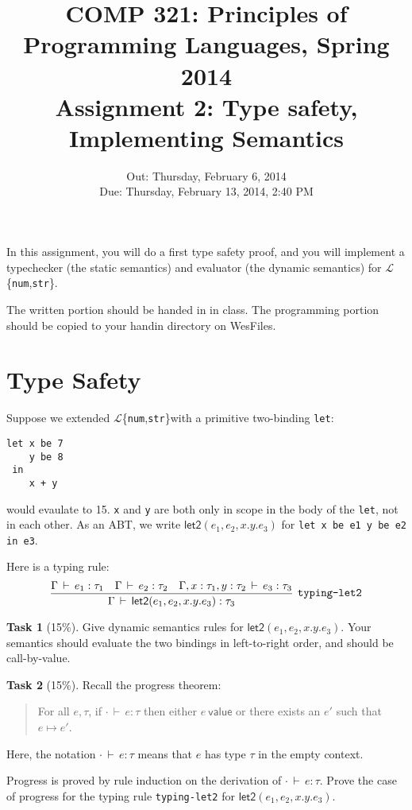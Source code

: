 \documentclass[11pt]{article}
\title{COMP 321: Principles of Programming Languages, Spring 2014 \\
       Assignment 2: Type safety, Implementing Semantics}
\date{Out: Thursday, February 6, 2014 \\
Due: Thursday, February 13, 2014, 2:40 PM}
\newcommand{\task}[2]
  {\bigskip \noindent
   {\bf Task #1} (#2\%).}
\newcommand{\EXP}[0]{$\mathcal{L}$\{\texttt{num},\texttt{str}\}}
\newcommand{\typeof}[3]{\ensuremath{#1 \, \vdash \, #2 : #3}}
\newcommand{\steps}[2]{\ensuremath{#1 \mapsto #2}}
\begin{document}
\newtheorem{theorem}{Theorem}
\newtheorem{lemma}[theorem]{Lemma}

\maketitle

In this assignment, you will do a first type safety proof, and you will
implement a typechecker (the static semantics) and evaluator (the
dynamic semantics) for \EXP.

The written portion should be handed in in class.
The programming portion should be copied to your handin directory on WesFiles.


\section{Type Safety}

\newcommand{\lettwo}[5]{\ensuremath{\mathsf{let2}(#1,#2,#3.#4.#5)}}

Suppose we extended \EXP with a primitive two-binding \verb|let|:
\begin{verbatim}
let x be 7 
    y be 8
 in
    x + y
\end{verbatim}
would evaulate to 15.  \verb|x| and \verb|y| are both only in scope in
the body of the \verb|let|, not in each other.  As an ABT, we write
\lettwo{e_1}{e_2}{x}{y}{e_3} for \verb|let x be e1 y be e2 in e3|.

Here is a typing rule:
\[
\infer[\texttt{typing-let2}]{\typeof{\Gamma}{\lettwo{e_1}{e_2}{x}{y}{e_3}}{\tau_3}}
      {\typeof{\Gamma}{e_1}{\tau_1} & 
        \typeof{\Gamma}{e_2}{\tau_2} & 
        \typeof{\Gamma, x : \tau_1 , y : \tau_2}{e_3}{\tau_3}}
\]

\task{1}{15} Give dynamic semantics rules for
\lettwo{e_1}{e_2}{x}{y}{e_3}.  Your semantics should evaluate the two
bindings in left-to-right order, and should be call-by-value.  

\task{2}{15} Recall the progress theorem:
\begin{quote}
For all $e,\tau$, if $\typeof{\cdot}{e}{\tau}$ then either $e \:
\mathsf{value}$ or there exists an $e'$ such that $\steps{e}{e'}$.
\end{quote}
Here, the notation \typeof{\cdot}{e}{\tau} means that $e$ has type
$\tau$ in the empty context. 

Progress is proved by rule induction on the derivation of
$\typeof{\cdot}{e}{\tau}$.  Prove the case of progress for the typing
rule \texttt{typing-let2} for {\lettwo{e_1}{e_2}{x}{y}{e_3}}.
\end{document}
